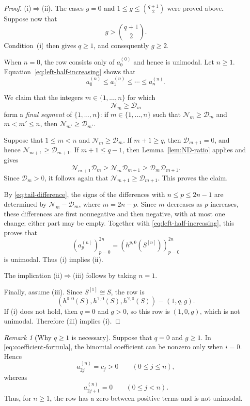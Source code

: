 \documentclass[12pt]{amsart}
\theoremstyle{plain}
\theoremstyle{definition}
\theoremstyle{remark}
\newtheorem{remark}[theorem]{Remark}
\begin{document}
\begin{proof}
\textup{(i)}\(\Rightarrow\)\textup{(ii)}.
The cases \(g=0\) and
\(1\le g\le\binom{q+1}{2}\) were proved above.  Suppose now that
\[
 g>\binom{q+1}{2}.
\]
Condition~\textup{(i)} then gives \(q\ge1\), and consequently \(g\ge2\).

When \(n=0\), the row consists only of \(a_0^{(0)}\) and hence is
unimodal.  Let \(n\ge1\).
Equation~\eqref{eq:left-half-increasing} shows that
\[
 a_0^{(n)}\le a_1^{(n)}\le\cdots\le a_n^{(n)}.
\]

We claim that the integers \(m\in\{1,\ldots,n\}\) for which
\[
 \mathcal N_m\ge\mathcal D_m
\]
form a \emph{final segment} of \(\{1,\ldots,n\}\): if $m\in\{1,\ldots,n\}$ such that $\mathcal N_m\ge\mathcal D_m$ and
$m<m'\le n$, then $\mathcal N_{m'}\ge\mathcal D_{m'}$. 

Suppose that \(1\le m<n\)
and \(\mathcal N_m\ge\mathcal D_m\).  If \(m+1\ge q\), then
\(\mathcal D_{m+1}=0\), and hence
\(\mathcal N_{m+1}\ge\mathcal D_{m+1}\).  If \(m+1\le q-1\), then
Lemma~\ref{lem:ND-ratio} applies and gives
\[
 \mathcal N_{m+1}\mathcal D_m
 \ge
 \mathcal N_m\mathcal D_{m+1}
 \ge
 \mathcal D_m\mathcal D_{m+1}.
\]
Since \(\mathcal D_m>0\), it follows again that
\(\mathcal N_{m+1}\ge\mathcal D_{m+1}\).  This proves the claim.

By \eqref{eq:tail-difference}, the signs of the differences with
\(n\le p\le2n-1\) are determined by
\(\mathcal N_m-\mathcal D_m\), where \(m=2n-p\).  Since \(m\) decreases
as \(p\) increases, these differences are first nonnegative and then
negative, with at most one change; either part may be empty.  Together
with \eqref{eq:left-half-increasing}, this proves that
\[
 \left(a_p^{(n)}\right)_{p=0}^{2n}
 =
 \left(h^{p,0}(S^{[n]})\right)_{p=0}^{2n}
\]
is unimodal.  Thus \textup{(i)} implies \textup{(ii)}.

The implication \textup{(ii)}\(\Rightarrow\)\textup{(iii)} follows by
taking \(n=1\).

Finally, assume \textup{(iii)}.  Since \(S^{[1]}\cong S\), the row is
\[
 \left(h^{0,0}(S),h^{1,0}(S),h^{2,0}(S)\right)
 =(1,q,g).
\]
If \textup{(i)} does not hold, then \(q=0\) and \(g>0\), so this row is
\((1,0,g)\), which is not unimodal.  Therefore \textup{(iii)} implies
\textup{(i)}.
\end{proof}

\begin{remark}[Why \(q\ge1\) is necessary]\label{rem:q-zero-unimodality}
Suppose that \(q=0\) and \(g\ge1\).  In
\eqref{eq:coefficient-formula}, the binomial coefficient can be nonzero
only when \(i=0\).  Hence
\[
 a_{2j}^{(n)}=c_j>0
 \qquad(0\le j\le n),
\]
whereas
\[
 a_{2j+1}^{(n)}=0
 \qquad(0\le j<n).
\]
Thus, for \(n\ge1\), the row has a zero between positive terms and is
not unimodal.
\end{remark}
\end{document}

